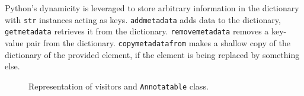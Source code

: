 Python's dynamicity is leveraged to store arbitrary information in the dictionary with \texttt{str} instances acting as keys. \texttt{addmetadata} adds data to the dictionary, \texttt{getmetadata} retrieves it from the dictionary. \texttt{removemetadata} removes a key-value pair from the dictionary. \texttt{copymetadatafrom} makes a shallow copy of the dictionary of the provided element, if the element is being replaced by something else.

\begin{figure}[ht]
	\centering
	\caption{Representation of visitors and \texttt{Annotatable} class.}
\label{class-diagram-visitors}
\end{figure}

\FloatBarrier
